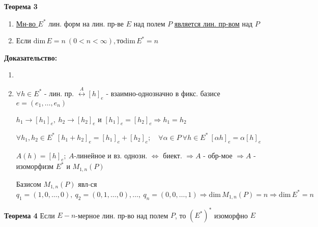 \textbf{Теорема 3}
\begin{enumerate}
 \item \underline{Мн-во $E^*$} лин. форм на лин. пр-ве $E$ над полем $P$ \underline{является лин. пр-вом} над $P$
 \item Если $\mathrm{dim}\, E = n\ (0 < n <\infty), то \mathrm{dim}\, E^* = n$
\end{enumerate}

\textbf{Доказательство:}
\begin{enumerate}
 \item %
 \item $\forall h \in E^*$ - лин. пр. $\overset{A}\leftrightarrow [h]_e$ - взаимно-однозначно в фикс. базисе $e=(e_1, \ldots, e_n)$

$h_1 \to [h_1]_e,\ h_2\to [h_2]_e$ и $[h_1]_e = [h_2]_e \Rightarrow h_1 = h_2$

$\forall h_1, h_2 \in E^*\ [h_1 + h_2]_e = [h_1]_e + [h_2]_e;\quad \forall \alpha \in P\ \forall h\in E^*\ [\alpha h]_e = \alpha [h]_e$

$A(h) = [h]_e;\ A$-линейное и вз. однозн. $\Leftrightarrow$ биект. $\Rightarrow A$ - обр-мое $\Rightarrow A$ - изоморфизм $E^*$ и $M_{1,n}(P)$

Базисом $M_{1,n}(P)$ явл-ся $q_1=(1,0,\ldots,0),\ q_2=(0,1,\ldots,0),\ldots,\ q_n = (0,0,\ldots, 1) \Rightarrow \mathrm{dim}\, M_{1,n} (P) = n \Rightarrow \mathrm{dim}\, E^* = n$
\end{enumerate}

\textbf{Теорема 4} Если $E-n$-мерное лин. пр-во над полем $P$, то $(E^*)^*$ изоморфно $E$


 









